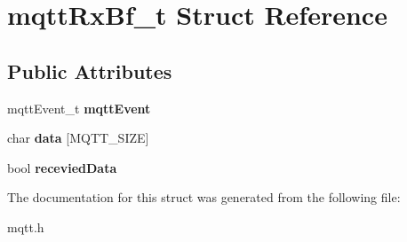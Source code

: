 \hypertarget{structmqttRxBf__t}{}\section{mqtt\+Rx\+Bf\+\_\+t Struct Reference}
\label{structmqttRxBf__t}
\subsection*{Public Attributes}
\begin{DoxyCompactItemize}
\item 
\mbox{\label{structmqttRxBf__t_af14afe6989fa691721b612eb6aea9a87}} 
mqtt\+Event\+\_\+t {\bfseries mqtt\+Event}
\item 
\mbox{\label{structmqttRxBf__t_a219c07affa381c0a3024ad757f14ed29}} 
char {\bfseries data} \mbox{[}M\+Q\+T\+T\+\_\+\+S\+I\+ZE\mbox{]}
\item 
\mbox{\label{structmqttRxBf__t_ab9e321c2fedce83b4720d93b5eeaacc7}} 
bool {\bfseries recevied\+Data}
\end{DoxyCompactItemize}


The documentation for this struct was generated from the following file\+:\begin{DoxyCompactItemize}
\item 
mqtt.\+h\end{DoxyCompactItemize}
